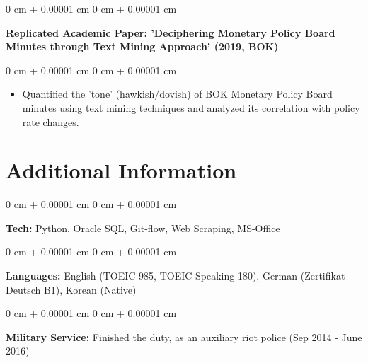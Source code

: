 \documentclass[10pt, letterpaper]{article}
\newenvironment{highlights}{
    \begin{itemize}[
        topsep=0.10 cm,
        parsep=0.10 cm,
        partopsep=0pt,
        itemsep=0pt,
        leftmargin=0 cm + 10pt
    ]
}{
    \end{itemize}
} %
\newenvironment{onecolentry}{
    \begin{adjustwidth}{
        0 cm + 0.00001 cm
    }{
        0 cm + 0.00001 cm
    }
}{
    \end{adjustwidth}
} %
\begin{document}
        \begin{onecolentry}
            \textbf{Replicated Academic Paper: 'Deciphering Monetary Policy Board Minutes through Text Mining Approach' (2019, BOK)}\end{onecolentry}

        \vspace{0.10 cm}
        \begin{onecolentry}
            \begin{highlights}
                \item Quantified the 'tone' (hawkish/dovish) of BOK Monetary Policy Board minutes using text mining techniques and analyzed its correlation with policy rate changes.
            \end{highlights}
        \end{onecolentry}



    
    \section{Additional Information}



        
        \begin{onecolentry}
            \textbf{Tech:} Python, Oracle SQL, Git-flow, Web Scraping, MS-Office
        \end{onecolentry}

        \vspace{0.2 cm}

        \begin{onecolentry}
            \textbf{Languages:} English (TOEIC 985, TOEIC Speaking 180), German (Zertifikat Deutsch B1), Korean (Native)
        \end{onecolentry}

        \vspace{0.2 cm}

        \begin{onecolentry}
            \textbf{Military Service:} Finished the duty, as an auxiliary riot police (Sep 2014 - June 2016)
        \end{onecolentry}


    
\end{document}
